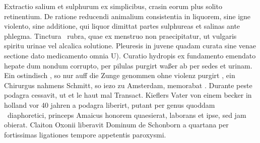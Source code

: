 \pstart  Extractio salium et sulphurum ex simplicibus, crasin eorum plus solito retinentium. De ratione reducendi animalium consistentia in liquorem, sine igne violento, sine additione, qui liquor dimittat partes sulphureas\protect{} et salinas\protect{} ante phlegma. Tinctura \earth\ rubra, quae ex menstruo non praecipitatur, ut vulgaris spiritu urinae vel alcalica   solutione. Pleuresis in juvene quadam curata sine venae sectione dato medicamento omnia U). Curatio hydropis\protect{}  ex fundamento emendato hepate\protect{} dum nondum corrupto, per pilulas purgirt waßer ab per sedes et urinam. Ein ostindisch , so nur auff die Zunge genommen ohne violenz purgirt , ein Chirurgus nahmens Schmitt\protect{}, so iezo zu Amsterdam, memorabat . \pend 
\pstart Durante peste podagra\protect{} cessavit, ut et le haut mal\protect{} Transact. Kieflers\protect{} Vater von einem becker in holland\protect{} vor 40 jahren a podagra\protect{} liberirt, putant per genus quoddam \astrosun\ diaphoretici\protect{}, princeps Amaicus honorem quaesierat, laborans et ipse, sed jam obierat. \pend 
\pstart Claiton\protect{} Oxonii\protect{} liberavit Dominum de Schonborn\protect{} a quartana\protect{} per fortissimas ligationes tempore appetentis paroxysmi. \pend 
